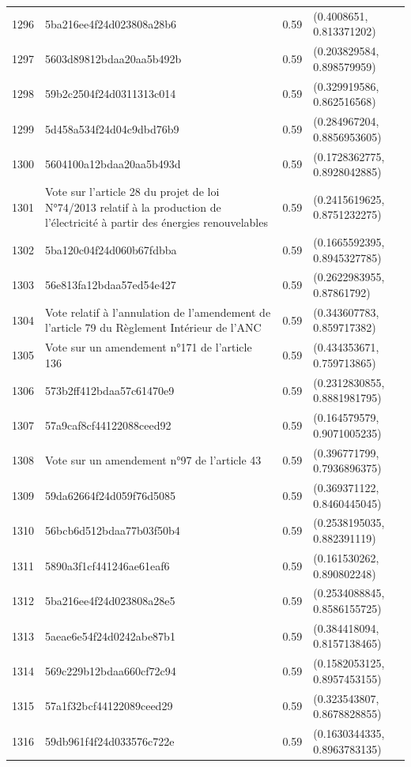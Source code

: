 \begin{table}[ht]
\begin{tabular}{rlrl}
  1296 & 5ba216ee4f24d023808a28b6 & 0.59 & (0.4008651, 0.813371202) \\ 
  1297 & 5603d89812bdaa20aa5b492b & 0.59 & (0.203829584, 0.898579959) \\ 
  1298 & 59b2c2504f24d0311313c014 & 0.59 & (0.329919586, 0.862516568) \\ 
  1299 & 5d458a534f24d04c9dbd76b9 & 0.59 & (0.284967204, 0.8856953605) \\ 
  1300 & 5604100a12bdaa20aa5b493d & 0.59 & (0.1728362775, 0.8928042885) \\ 
  1301 & Vote sur l'article 28 du projet de loi N°74/2013 relatif à la production de l'électricité à partir des énergies renouvelables & 0.59 & (0.2415619625, 0.8751232275) \\ 
  1302 & 5ba120c04f24d060b67fdbba & 0.59 & (0.1665592395, 0.8945327785) \\ 
  1303 & 56e813fa12bdaa57ed54e427 & 0.59 & (0.2622983955, 0.87861792) \\ 
  1304 & Vote relatif à l'annulation de l'amendement de l'article 79 du Règlement Intérieur de l'ANC & 0.59 & (0.343607783, 0.859717382) \\ 
  1305 & Vote sur un amendement n°171 de l'article 136 & 0.59 & (0.434353671, 0.759713865) \\ 
  1306 & 573b2ff412bdaa57c61470e9 & 0.59 & (0.2312830855, 0.8881981795) \\ 
  1307 & 57a9caf8cf44122088ceed92 & 0.59 & (0.164579579, 0.9071005235) \\ 
  1308 & Vote sur un amendement n°97 de l'article 43 & 0.59 & (0.396771799, 0.7936896375) \\ 
  1309 & 59da62664f24d059f76d5085 & 0.59 & (0.369371122, 0.8460445045) \\ 
  1310 & 56bcb6d512bdaa77b03f50b4 & 0.59 & (0.2538195035, 0.882391119) \\ 
  1311 & 5890a3f1cf441246ae61eaf6 & 0.59 & (0.161530262, 0.890802248) \\ 
  1312 & 5ba216ee4f24d023808a28e5 & 0.59 & (0.2534088845, 0.8586155725) \\ 
  1313 & 5aeae6e54f24d0242abe87b1 & 0.59 & (0.384418094, 0.8157138465) \\ 
  1314 & 569c229b12bdaa660cf72c94 & 0.59 & (0.1582053125, 0.8957453155) \\ 
  1315 & 57a1f32bcf44122089ceed29 & 0.59 & (0.323543807, 0.8678828855) \\ 
  1316 & 59db961f4f24d033576c722e & 0.59 & (0.1630344335, 0.8963783135) \\ 

\end{tabular}
\end{table}
